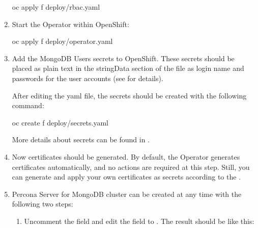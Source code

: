 \documentclass[letterpaper,10pt,english]{sphinxmanual}
\begin{document}
\begin{enumerate}
\begin{sphinxVerbatim}[commandchars=\\\{\}]
\PYGZdl{} oc apply \PYGZhy{}f deploy/rbac.yaml
\end{sphinxVerbatim}

\item {} 
Start the Operator within OpenShift:

\begin{sphinxVerbatim}[commandchars=\\\{\}]
\PYGZdl{} oc apply \PYGZhy{}f deploy/operator.yaml
\end{sphinxVerbatim}

\item {} 
Add the MongoDB Users secrets to OpenShift. These secrets
should be placed as plain text in the stringData section of the
 file as login name and
passwords for the user accounts (see 
for details).

After editing the yaml file, the secrets should be created
with the following command:

\begin{sphinxVerbatim}[commandchars=\\\{\}]
\PYGZdl{} oc create \PYGZhy{}f deploy/secrets.yaml
\end{sphinxVerbatim}

More details about secrets can be found in {\hyperref[\detokenize{users:users}]{}}.

\item {} 
Now certificates should be generated. By default, the Operator generates
certificates automatically, and no actions are required at this step. Still,
you can generate and apply your own certificates as secrets according
to the {\hyperref[\detokenize{TLS:tls}]{}}.

\item {} 
Percona Server for MongoDB cluster can
be created at any time with the following two steps:
\begin{enumerate}
%
\item {} 
Uncomment the  field  and edit the field
to . The result should be like this:


\end{enumerate}
\end{enumerate}
\end{document}
